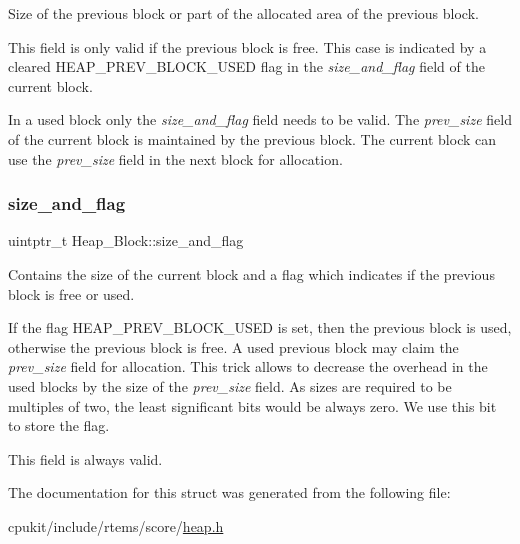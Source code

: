 Size of the previous block or part of the allocated area of the previous block. 

This field is only valid if the previous block is free. This case is indicated by a cleared {\ttfamily H\+E\+A\+P\+\_\+\+P\+R\+E\+V\+\_\+\+B\+L\+O\+C\+K\+\_\+\+U\+S\+ED} flag in the {\itshape size\+\_\+and\+\_\+flag} field of the current block.

In a used block only the {\itshape size\+\_\+and\+\_\+flag} field needs to be valid. The {\itshape prev\+\_\+size} field of the current block is maintained by the previous block. The current block can use the {\itshape prev\+\_\+size} field in the next block for allocation. \mbox{\label{structHeap__Block_ae6f771ed25f18d98146417d7cf38d69c}} 
\subsubsection{\texorpdfstring{size\_and\_flag}{size\_and\_flag}}
{\footnotesize\ttfamily uintptr\+\_\+t Heap\+\_\+\+Block\+::size\+\_\+and\+\_\+flag}



Contains the size of the current block and a flag which indicates if the previous block is free or used. 

If the flag {\ttfamily H\+E\+A\+P\+\_\+\+P\+R\+E\+V\+\_\+\+B\+L\+O\+C\+K\+\_\+\+U\+S\+ED} is set, then the previous block is used, otherwise the previous block is free. A used previous block may claim the {\itshape prev\+\_\+size} field for allocation. This trick allows to decrease the overhead in the used blocks by the size of the {\itshape prev\+\_\+size} field. As sizes are required to be multiples of two, the least significant bits would be always zero. We use this bit to store the flag.

This field is always valid. 

The documentation for this struct was generated from the following file\+:\begin{DoxyCompactItemize}
\item 
cpukit/include/rtems/score/\mbox{\hyperlink{heap_8h}{heap.\+h}}\end{DoxyCompactItemize}
